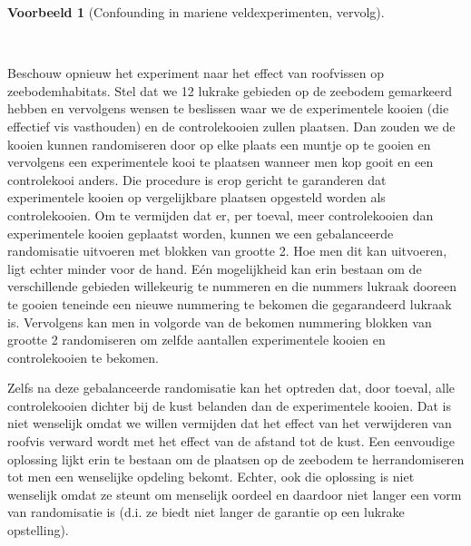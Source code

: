 \documentclass[
  dutch,
  letterpaper,
  12pt]{book}
\theoremstyle{definition}
\theoremstyle{definition}
\theoremstyle{definition}
\newtheorem{example}{Voorbeeld}[chapter]
\theoremstyle{remark}
\begin{document}
\begin{example}[Confounding in mariene veldexperimenten,
vervolg]\protect\hypertarget{exm-confounding-in-mariene-veldexperimenten-vervolg}{}\label{exm-confounding-in-mariene-veldexperimenten-vervolg}

~

\end{example}

Beschouw opnieuw het experiment naar het effect van roofvissen op
zeebodemhabitats. Stel dat we 12 lukrake gebieden op de zeebodem
gemarkeerd hebben en vervolgens wensen te beslissen waar we de
experimentele kooien (die effectief vis vasthouden) en de controlekooien
zullen plaatsen. Dan zouden we de kooien kunnen randomiseren door op
elke plaats een muntje op te gooien en vervolgens een experimentele kooi
te plaatsen wanneer men kop gooit en een controlekooi anders. Die
procedure is erop gericht te garanderen dat experimentele kooien op
vergelijkbare plaatsen opgesteld worden als controlekooien. Om te
vermijden dat er, per toeval, meer controlekooien dan experimentele
kooien geplaatst worden, kunnen we een gebalanceerde randomisatie
uitvoeren met blokken van grootte 2. Hoe men dit kan uitvoeren, ligt
echter minder voor de hand. Eén mogelijkheid kan erin bestaan om de
verschillende gebieden willekeurig te nummeren en die nummers lukraak
dooreen te gooien teneinde een nieuwe nummering te bekomen die
gegarandeerd lukraak is. Vervolgens kan men in volgorde van de bekomen
nummering blokken van grootte 2 randomiseren om zelfde aantallen
experimentele kooien en controlekooien te bekomen.

Zelfs na deze gebalanceerde randomisatie kan het optreden dat, door
toeval, alle controlekooien dichter bij de kust belanden dan de
experimentele kooien. Dat is niet wenselijk omdat we willen vermijden
dat het effect van het verwijderen van roofvis verward wordt met het
effect van de afstand tot de kust. Een eenvoudige oplossing lijkt erin
te bestaan om de plaatsen op de zeebodem te herrandomiseren tot men een
wenselijke opdeling bekomt. Echter, ook die oplossing is niet wenselijk
omdat ze steunt om menselijk oordeel en daardoor niet langer een vorm
van randomisatie is (d.i. ze biedt niet langer de garantie op een
lukrake opstelling).
\end{document}

